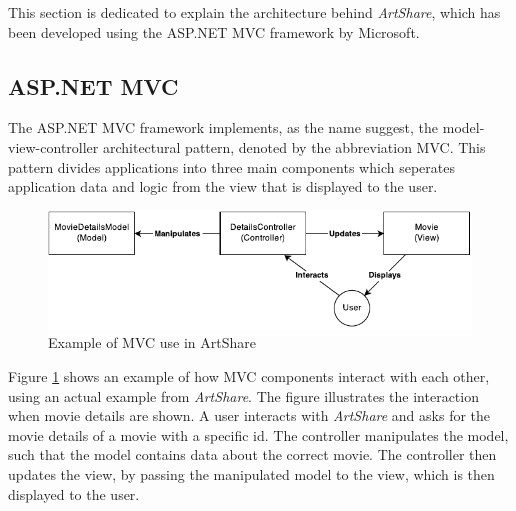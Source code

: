 \documentclass[../report.tex]{subfiles}
\begin{document}
\graphicspath{{img/}{../img/}}

This section is dedicated to explain the architecture behind \textit{ArtShare}, which has been developed using the ASP.NET MVC framework by Microsoft\cite{microsoft2014}. 


\subsection{ASP.NET MVC}

The ASP.NET MVC framework implements, as the name suggest, the model-view-controller architectural pattern, denoted by the abbreviation MVC. This pattern divides applications into three main components which seperates application data and logic from the view that is displayed to the user. 


\begin{figure}[H]
\includegraphics[width=\linewidth]{mvc.pdf}
\caption{Example of MVC use in ArtShare}
\label{fig:mvc}
\end{figure}

Figure \ref{fig:mvc} shows an example of how MVC components interact with each other, using an actual example from \textit{ArtShare}. The figure illustrates the interaction when movie details are shown. A user interacts with \textit{ArtShare} and asks for the movie details of a movie with a specific id. The controller manipulates the model, such that the model contains data about the correct movie. The controller then updates the view, by passing the manipulated model to the view, which is then displayed to the user.
\end{document}
